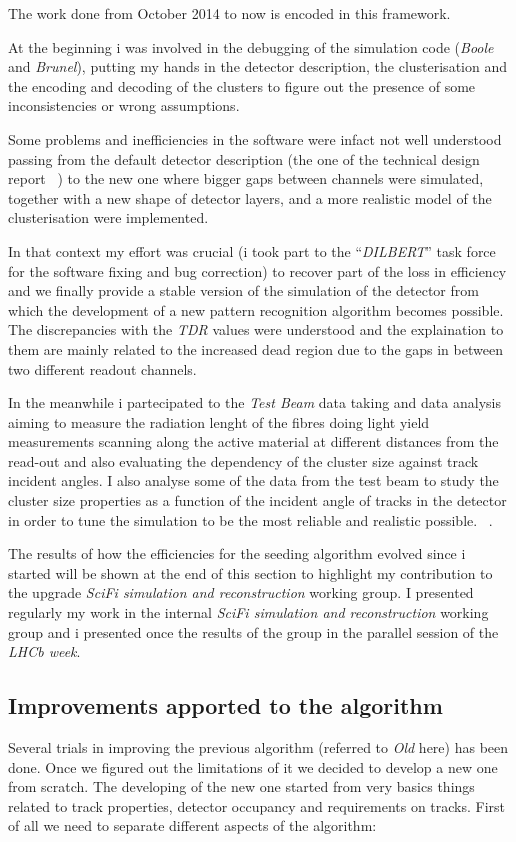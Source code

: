 \documentclass[paper=a4, fontsize=10pt]{scrartcl}
\numberwithin{equation}{section}		%
\numberwithin{figure}{section}			%
\numberwithin{table}{section}				%
\begin{document}
The work done from October 2014 to now is encoded in this framework. 

At the beginning i was involved in the debugging of the simulation code (\textit{Boole} and \textit{Brunel}), putting my hands in the detector description, the clusterisation and the encoding and decoding of the clusters to figure out the presence of some inconsistencies or wrong assumptions.

Some problems and inefficiencies in the software were infact not well understood passing from the default detector description (the one of the technical design report ~\cite{SciFiTDR}) to the new one where bigger gaps between channels were simulated, together with a new shape of detector layers, and a more realistic model of the clusterisation were implemented. 

In that context my effort was crucial (i took part to the ``\textit{DILBERT}'' task force for the software fixing and bug correction) to recover part of the loss in efficiency and we finally provide a stable version of the simulation of the detector from which the development of a new pattern recognition algorithm becomes possible. The discrepancies with the \textit{TDR} values were understood and the explaination to them are mainly related to the increased dead region due to the gaps in between two different readout channels.

In the meanwhile i partecipated to the \textit{Test Beam} data taking and data analysis aiming to measure the radiation lenght of the fibres doing light yield measurements scanning along the active material at different distances from the read-out and also evaluating the dependency of the cluster size against track incident angles. I also analyse some of the data from the test beam to study the cluster size properties as a function of the incident angle of tracks in the detector in order to tune the simulation to be the most reliable and realistic possible. ~\cite{AnalysisOrsay}.

The results of how the efficiencies for the seeding algorithm evolved since i started will be shown at the end of this section to highlight my contribution to the upgrade \textit{SciFi simulation and reconstruction} working group. I presented regularly my work in the internal \textit{SciFi simulation and reconstruction} working group and i presented once the results of the group in the parallel session of the \textit{LHCb week}. 

\subsection{Improvements apported to the algorithm}
Several trials in improving the previous algorithm (referred to \textit{Old} here) has been done. Once we figured out the limitations of it we decided to develop a new one from scratch. The developing of the new one started from very basics things related to track properties, detector occupancy and requirements on tracks.
First of all we need to separate different aspects of the algorithm: 
\end{document}
